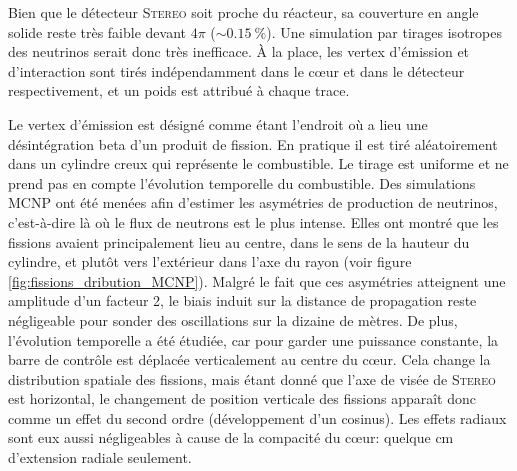 Bien que le détecteur \textsc{Stereo} soit proche du réacteur, sa couverture en angle solide reste très faible devant $4\pi$ ($\sim \SI{0.15}{\%}$). Une simulation par tirages isotropes des neutrinos serait donc très inefficace. À la place, les vertex d'émission et d'interaction sont tirés indépendamment dans le c\oe ur et dans le détecteur respectivement, et un poids est attribué à chaque trace.

\bigbreak

Le vertex d'émission est désigné comme étant l'endroit où a lieu une désintégration beta d'un produit de fission. En pratique il est tiré aléatoirement dans un cylindre creux qui représente le combustible. Le tirage est uniforme et ne prend pas en compte l'évolution temporelle du combustible. Des simulations MCNP ont été menées afin d'estimer les asymétries de production de neutrinos, c'est-à-dire là où le flux de neutrons est le plus intense. Elles ont montré que les fissions avaient principalement lieu au centre, dans le sens de la hauteur du cylindre, et plutôt vers l'extérieur dans l'axe du rayon (voir figure \ref{fig:fissions_dribution_MCNP}). Malgré le fait que ces asymétries atteignent une amplitude d'un facteur 2, le biais induit sur la distance de propagation reste négligeable pour sonder des oscillations sur la dizaine de mètres. De plus, l'évolution temporelle a été étudiée, car pour garder une puissance constante, la barre de contrôle est déplacée verticalement au centre du c\oe ur. Cela change la distribution spatiale des fissions, mais étant donné que l'axe de visée de \textsc{Stereo} est horizontal, le changement de position verticale des fissions apparaît donc comme un effet du second ordre (développement d'un cosinus). Les effets radiaux sont eux aussi négligeables à cause de la compacité du c\oe ur: quelque cm d'extension radiale seulement.\\


